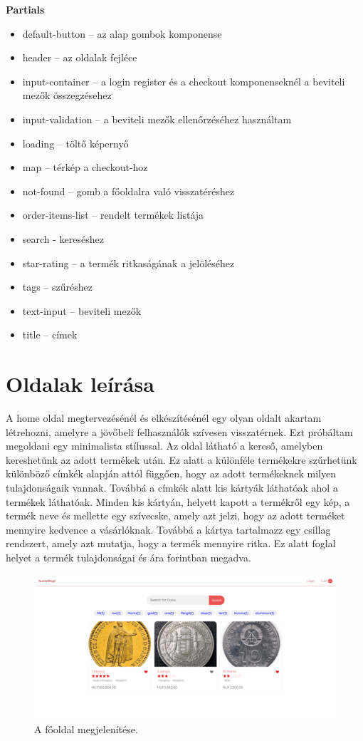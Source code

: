 \textbf{Partials}
\begin{itemize}
    \item default-button – az alap gombok komponense
    \item header – az oldalak fejléce
    \item input-container – a login register és a checkout komponenseknél a beviteli mezők összegzésehez
    \item input-validation – a beviteli mezők ellenőrzéséhez használtam
    \item loading – töltő képernyő
    \item map – térkép a checkout-hoz
    \item not-found – gomb a főoldalra való visszatéréshez
    \item order-items-list – rendelt termékek listája
    \item search - kereséshez
    \item star-rating – a termék ritkaságának a jelöléséhez
    \item tags – szűréshez
    \item text-input – beviteli mezők
    \item title – címek
\end{itemize}

\section{Oldalak leírása}
A home oldal megtervezésénél és elkészítésénél egy olyan oldalt akartam létrehozni, amelyre a jövőbeli felhasználók szívesen visszatérnek. Ezt próbáltam megoldani egy minimalista stílussal. Az oldal látható a kereső, amelyben kereshetünk az adott termékek után. Ez alatt a különféle termékekre szűrhetünk különböző címkék alapján attól függően, hogy az adott termékeknek milyen tulajdonságaik vannak. Továbbá a címkék alatt kis kártyák láthatóak ahol a termékek láthatóak. Minden kis kártyán, helyett kapott a termékről egy kép, a termék neve és mellette egy szívecske, amely azt jelzi, hogy az adott terméket mennyire kedvence a vásárlóknak. Továbbá a kártya tartalmazz egy csillag rendszert, amely azt mutatja, hogy a termék mennyire ritka. Ez alatt foglal helyet a termék tulajdonságai és ára forintban megadva.

\begin{figure}[h]
\centering
\includegraphics[scale=1]{images/home.png}
\caption{A főoldal megjelenítése.}
\label{fig:fo_oldal}
\end{figure}

